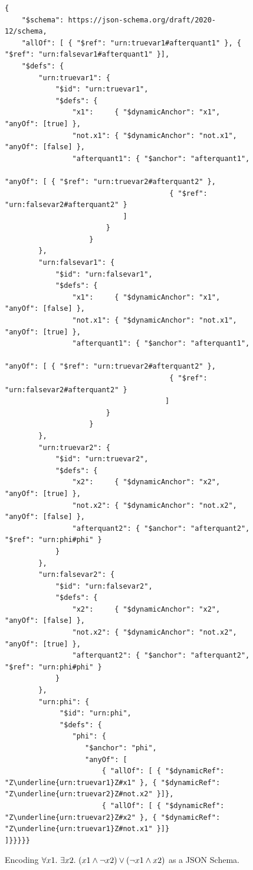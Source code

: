 {\begin{figure}
\begin{querybox}{}
\begin{lstlisting}[style=query,escapechar=Z]
{
    "$schema": https://json-schema.org/draft/2020-12/schema,
    "allOf": [ { "$ref": "urn:truevar1#afterquant1" }, { "$ref": "urn:falsevar1#afterquant1" }],
    "$defs": {
        "urn:truevar1": {
            "$id": "urn:truevar1",
            "$defs": {
                "x1":     { "$dynamicAnchor": "x1",     "anyOf": [true] },
                "not.x1": { "$dynamicAnchor": "not.x1", "anyOf": [false] },
                "afterquant1": { "$anchor": "afterquant1",
                                                    "anyOf": [ { "$ref": "urn:truevar2#afterquant2" },
                                       { "$ref": "urn:falsevar2#afterquant2" }
                            ]
                        }
                    }
        },
        "urn:falsevar1": {
            "$id": "urn:falsevar1",
            "$defs": {
                "x1":     { "$dynamicAnchor": "x1",     "anyOf": [false] },
                "not.x1": { "$dynamicAnchor": "not.x1", "anyOf": [true] },
                "afterquant1": { "$anchor": "afterquant1",
                                                    "anyOf": [ { "$ref": "urn:truevar2#afterquant2" },
                                       { "$ref": "urn:falsevar2#afterquant2" }
                                      ]
                        }
                    }
        },
        "urn:truevar2": {
            "$id": "urn:truevar2",
            "$defs": {
                "x2":     { "$dynamicAnchor": "x2",     "anyOf": [true] },
                "not.x2": { "$dynamicAnchor": "not.x2", "anyOf": [false] },
                "afterquant2": { "$anchor": "afterquant2", "$ref": "urn:phi#phi" }
            }
        },
        "urn:falsevar2": {
            "$id": "urn:falsevar2",
            "$defs": {
                "x2":     { "$dynamicAnchor": "x2",     "anyOf": [false] },
                "not.x2": { "$dynamicAnchor": "not.x2", "anyOf": [true] },
                "afterquant2": { "$anchor": "afterquant2", "$ref": "urn:phi#phi" }
            }
        },
        "urn:phi": {
             "$id": "urn:phi",
             "$defs": {
                "phi": {
                   "$anchor": "phi", 
                   "anyOf": [
                       { "allOf": [ { "$dynamicRef": "Z\underline{urn:truevar1}Z#x1" }, { "$dynamicRef": "Z\underline{urn:truevar2}Z#not.x2" }]},
                       { "allOf": [ { "$dynamicRef": "Z\underline{urn:truevar2}Z#x2" }, { "$dynamicRef": "Z\underline{urn:truevar1}Z#not.x1" }]}
]}}}}}
\end{lstlisting}
\end{querybox}
\caption{Encoding $\forall x1.\ \exists x2.\ (x1 \wedge \neg x2) \vee (\neg x1 \wedge x2)$ as a JSON Schema.}
\label{fig:encoding}
\end{figure}
}%


